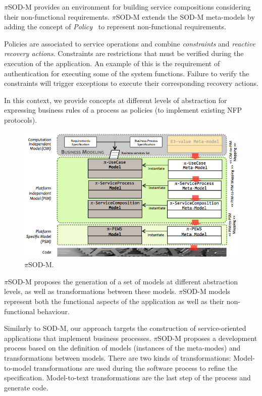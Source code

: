 $\pi$SOD-M provides an environment for building service compositions considering
their non-functional requirements. 
$\pi$SOD-M extends the SOD-M meta-models by adding
the concept of \textit{Policy}~\cite{Espinosa-Oviedo2011a}
to represent non-functional requirements.

Policies are associated to service operations and combine \textit{constraints} and \textit{reactive recovery actions}.
Constraints are restrictions that must be verified during the execution of the application. 
An example of this is the requirement of authentication for executing some of the system functions. 
Failure to verify the constraints will trigger exceptions to execute their corresponding recovery actions.

In this context, we provide concepts at different levels of abstraction for expressing business rules of a process as policies (to implement existing NFP protocols).

\begin{figure}[h]
\centering
\includegraphics[width=1.0\textwidth]{figs/piSODM}
\caption{$\pi$SOD-M.}
\label{fig:piSOD-M}
\end{figure}

$\pi$SOD-M proposes the generation of a set of models at different abstraction levels, as
well as transformations between these models.
$\pi$SOD-M models represent both the functional aspects of the application as well as their non-functional behaviour. 


Similarly to SOD-M, our approach targets the construction of service-oriented applications that implement business processes.
$\pi$SOD-M proposes a development process based on the definition of models
(instances of the meta-modes) and transformations between models.
There are two kinds of transformations:
Model-to-model transformations are used during the software process to refine the specification.
Model-to-text transformations are the last step of the process and generate code.

